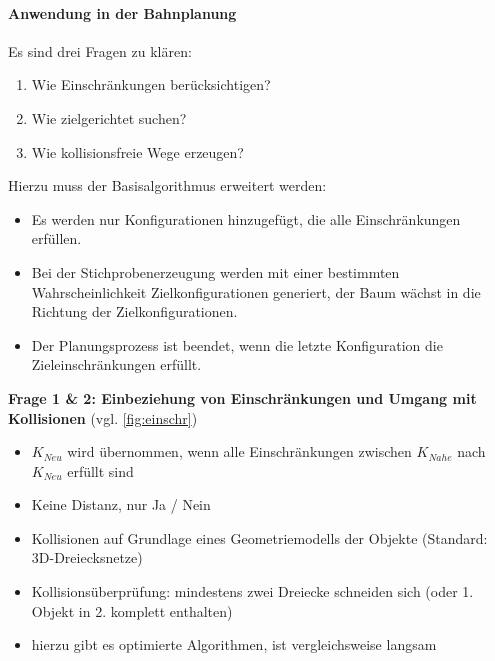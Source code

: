 \paragraph{Anwendung in der Bahnplanung} Es sind drei Fragen zu klären:
\begin{enumerate}
\item Wie Einschränkungen berücksichtigen?
\item Wie zielgerichtet suchen?
\item Wie kollisionsfreie Wege erzeugen?
\end{enumerate}
Hierzu muss der Basisalgorithmus erweitert werden:
\begin{itemize}
\item Es werden nur Konfigurationen hinzugefügt, die alle Einschränkungen erfüllen.
\item Bei der Stichprobenerzeugung werden mit einer bestimmten Wahrscheinlichkeit Zielkonfigurationen generiert, der Baum wächst in die Richtung der Zielkonfigurationen.
\item Der Planungsprozess ist beendet, wenn die letzte Konfiguration die Zieleinschränkungen erfüllt.
\end{itemize} 
\textbf{Frage 1 \& 2: Einbeziehung von Einschränkungen und Umgang mit Kollisionen} (vgl. \autoref{fig:einschr})
\begin{itemize}
\item $K_{Neu}$ wird übernommen, wenn alle Einschränkungen zwischen $K_{Nahe}$ nach $K_{Neu}$ erfüllt sind
\item Keine Distanz, nur Ja / Nein
\item Kollisionen auf Grundlage eines Geometriemodells der Objekte (Standard: 3D-Dreiecksnetze)
\item Kollisionsüberprüfung: mindestens zwei Dreiecke schneiden sich (oder 1. Objekt in 2. komplett enthalten)
\item hierzu gibt es optimierte Algorithmen, ist vergleichsweise langsam
\end{itemize}
